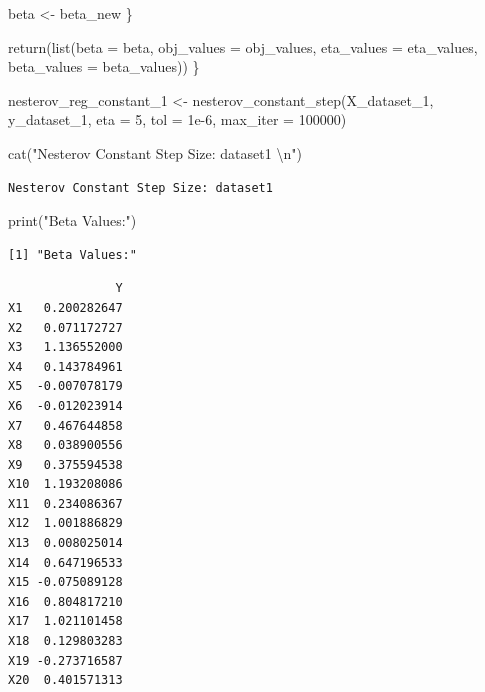 \documentclass[
  letterpaper,
  DIV=11,
  numbers=noendperiod]{scrartcl}
\newenvironment{Shaded}{\begin{snugshade}}{\end{snugshade}}
\newcommand{\AttributeTok}[1]{\textcolor[rgb]{0.40,0.45,0.13}{#1}}
\newcommand{\DecValTok}[1]{\textcolor[rgb]{0.68,0.00,0.00}{#1}}
\newcommand{\FloatTok}[1]{\textcolor[rgb]{0.68,0.00,0.00}{#1}}
\newcommand{\FunctionTok}[1]{\textcolor[rgb]{0.28,0.35,0.67}{#1}}
\newcommand{\NormalTok}[1]{\textcolor[rgb]{0.00,0.23,0.31}{#1}}
\newcommand{\OtherTok}[1]{\textcolor[rgb]{0.00,0.23,0.31}{#1}}
\newcommand{\SpecialCharTok}[1]{\textcolor[rgb]{0.37,0.37,0.37}{#1}}
\newcommand{\StringTok}[1]{\textcolor[rgb]{0.13,0.47,0.30}{#1}}
\begin{document}
\begin{Shaded}
\begin{Highlighting}[]
\NormalTok{    beta }\OtherTok{\textless{}{-}}\NormalTok{ beta\_new}
\NormalTok{  \}}
  
  \FunctionTok{return}\NormalTok{(}\FunctionTok{list}\NormalTok{(}\AttributeTok{beta =}\NormalTok{ beta, }\AttributeTok{obj\_values =}\NormalTok{ obj\_values, }\AttributeTok{eta\_values =}\NormalTok{ eta\_values, }\AttributeTok{beta\_values =}\NormalTok{ beta\_values))}
\NormalTok{\}}

\NormalTok{nesterov\_reg\_constant\_1 }\OtherTok{\textless{}{-}} \FunctionTok{nesterov\_constant\_step}\NormalTok{(X\_dataset\_1, y\_dataset\_1, }\AttributeTok{eta =} \DecValTok{5}\NormalTok{, }\AttributeTok{tol =} \FloatTok{1e{-}6}\NormalTok{, }\AttributeTok{max\_iter =} \DecValTok{100000}\NormalTok{)}

\FunctionTok{cat}\NormalTok{(}\StringTok{"Nesterov Constant Step Size: dataset1 }\SpecialCharTok{\textbackslash{}n}\StringTok{"}\NormalTok{)}
\end{Highlighting}
\end{Shaded}

\begin{verbatim}
Nesterov Constant Step Size: dataset1 
\end{verbatim}

\begin{Shaded}
\begin{Highlighting}[]
\FunctionTok{print}\NormalTok{(}\StringTok{"Beta Values:"}\NormalTok{)}
\end{Highlighting}
\end{Shaded}

\begin{verbatim}
[1] "Beta Values:"
\end{verbatim}

\begin{Shaded}
\end{Shaded}

\begin{verbatim}
               Y
X1   0.200282647
X2   0.071172727
X3   1.136552000
X4   0.143784961
X5  -0.007078179
X6  -0.012023914
X7   0.467644858
X8   0.038900556
X9   0.375594538
X10  1.193208086
X11  0.234086367
X12  1.001886829
X13  0.008025014
X14  0.647196533
X15 -0.075089128
X16  0.804817210
X17  1.021101458
X18  0.129803283
X19 -0.273716587
X20  0.401571313
\end{verbatim}
\end{document}
